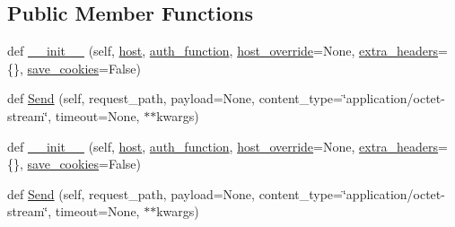 \subsection*{Public Member Functions}
\begin{DoxyCompactItemize}
\item 
def \mbox{\hyperlink{classupload_1_1_abstract_rpc_server_a3f6bc1bd16b52bd5a5c33a1fedeef2d0}{\+\_\+\+\_\+init\+\_\+\+\_\+}} (self, \mbox{\hyperlink{classupload_1_1_abstract_rpc_server_ab7188d827e2faddcf970f524f5856192}{host}}, \mbox{\hyperlink{classupload_1_1_abstract_rpc_server_aee0090a3bcf07b913a7dd596a5dabb8f}{auth\+\_\+function}}, \mbox{\hyperlink{classupload_1_1_abstract_rpc_server_a783a4a7e4ffb776a57a3f267300a213b}{host\+\_\+override}}=None, \mbox{\hyperlink{classupload_1_1_abstract_rpc_server_adbbf0109afc13d58d7815fa143cb779f}{extra\+\_\+headers}}=\{\}, \mbox{\hyperlink{classupload_1_1_abstract_rpc_server_affe342205c4647d41b127f5a5634858b}{save\+\_\+cookies}}=False)
\item 
def \mbox{\hyperlink{classupload_1_1_abstract_rpc_server_ad6555ae8993a52035191f8572762e741}{Send}} (self, request\+\_\+path, payload=None, content\+\_\+type=\char`\"{}application/octet-\/stream\char`\"{}, timeout=None, $\ast$$\ast$kwargs)
\item 
def \mbox{\hyperlink{classupload_1_1_abstract_rpc_server_a3f6bc1bd16b52bd5a5c33a1fedeef2d0}{\+\_\+\+\_\+init\+\_\+\+\_\+}} (self, \mbox{\hyperlink{classupload_1_1_abstract_rpc_server_ab7188d827e2faddcf970f524f5856192}{host}}, \mbox{\hyperlink{classupload_1_1_abstract_rpc_server_aee0090a3bcf07b913a7dd596a5dabb8f}{auth\+\_\+function}}, \mbox{\hyperlink{classupload_1_1_abstract_rpc_server_a783a4a7e4ffb776a57a3f267300a213b}{host\+\_\+override}}=None, \mbox{\hyperlink{classupload_1_1_abstract_rpc_server_adbbf0109afc13d58d7815fa143cb779f}{extra\+\_\+headers}}=\{\}, \mbox{\hyperlink{classupload_1_1_abstract_rpc_server_affe342205c4647d41b127f5a5634858b}{save\+\_\+cookies}}=False)
\item 
def \mbox{\hyperlink{classupload_1_1_abstract_rpc_server_ad6555ae8993a52035191f8572762e741}{Send}} (self, request\+\_\+path, payload=None, content\+\_\+type=\char`\"{}application/octet-\/stream\char`\"{}, timeout=None, $\ast$$\ast$kwargs)
\end{DoxyCompactItemize}
